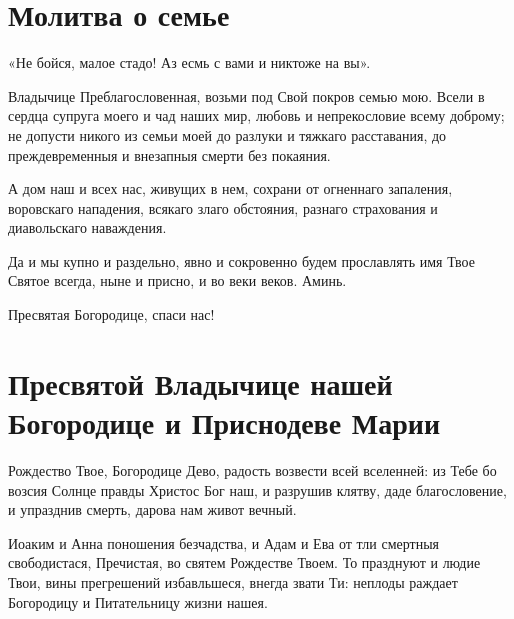 \section{Молитва о семье}\begin{mymulticols}


«Не бойся, малое стадо! Аз есмь с вами и никтоже на вы».


Владычице Преблагословенная, возьми под Свой покров семью мою. Всели в сердца супруга моего и чад наших мир, любовь и непрекословие всему доброму;  не допусти никого из семьи моей до разлуки и тяжкаго расставания, до преждевременныя и внезапныя смерти без покаяния.

А дом наш и всех нас, живущих в нем, сохрани от огненнаго запаления, воровскаго нападения, всякаго злаго обстояния, разнаго страхования и диавольскаго наваждения.

Да и мы купно и раздельно, явно и сокровенно будем прославлять имя Твое Святое всегда, ныне и присно, и во веки веков. Аминь.


Пресвятая Богородице, спаси нас!

\end{mymulticols}

\mychapterending



\vspace{-\baselineskip}
\longpage
\section{Пресвятой Владычице нашей Богородице и Приснодеве Марии}\begin{mymulticols}



Рождество Твое, Богородице Дево, радость возвести всей вселенней: из Тебе бо возсия Солнце правды Христос Бог наш, и разрушив клятву, даде благословение, и упразднив смерть, дарова нам живот вечный.




Иоаким и Анна поношения безчадства, и Адам и Ева от тли смертныя свободистася, Пречистая, во святем Рождестве Твоем. То празднуют и людие Твои, вины прегрешений избавльшеся, внегда звати Ти: неплоды раждает Богородицу и Питательницу жизни нашея.

\end{mymulticols}

